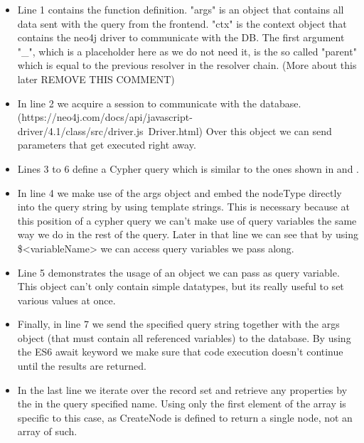 \begin{itemize}
\item Line 1 contains the function definition. "args" is an object that contains all data sent with the query from the frontend. "ctx" is the context object that contains the neo4j driver to communicate with the DB. The first argument "\_", which is a placeholder here as we do not need it, is the so called "parent" which is equal to the previous resolver in the resolver chain. (More about this later REMOVE THIS COMMENT)
\item In line 2 we acquire a session to communicate with the database. (https://neo4j.com/docs/api/javascript-driver/4.1/class/src/driver.js~Driver.html) Over this object we can send parameters that get executed right away.
\item Lines 3 to 6 define a Cypher query which is similar to the ones shown in  and . 
\item In line 4 we make use of the args object and embed the nodeType directly into the query string by using template strings. This is necessary because at this position of a cypher query we can't make use of query variables the same way we do in the rest of the query. Later in that line we can see that by using \$<variableName> we can access query variables we pass along.
\item Line 5 demonstrates the usage of an object we can pass as query variable. This object can't only contain simple datatypes, but its really useful to set various values at once.
\item Finally, in line 7 we send the specified query string together with the args object (that must contain all referenced variables) to the database. By using the ES6 await keyword we make sure that code execution doesn't continue until the results are returned.
\item In the last line we iterate over the record set and retrieve any properties by the in the query specified name. Using only the first element of the array is specific to this case, as CreateNode is defined to return a single node, not an array of such.
\end{itemize}

